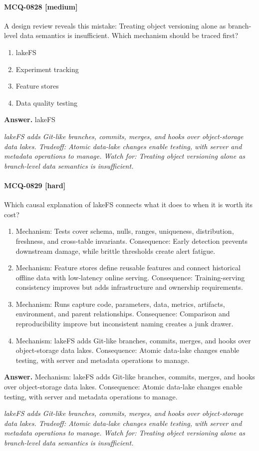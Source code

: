 \paragraph{MCQ-0828 [medium]} A design review reveals this mistake: Treating object versioning alone as branch-level data semantics is insufficient. Which mechanism should be traced first?
\begin{enumerate}[label=\Alph*.]
\item lakeFS
\item Experiment tracking
\item Feature stores
\item Data quality testing
\end{enumerate}
\noindent\textbf{Answer.} lakeFS
\par\textit{lakeFS adds Git-like branches, commits, merges, and hooks over object-storage data lakes. Tradeoff: Atomic data-lake changes enable testing, with server and metadata operations to manage. Watch for: Treating object versioning alone as branch-level data semantics is insufficient.}
\paragraph{MCQ-0829 [hard]} Which causal explanation of lakeFS connects what it does to when it is worth its cost?
\begin{enumerate}[label=\Alph*.]
\item Mechanism: Tests cover schema, nulls, ranges, uniqueness, distribution, freshness, and cross-table invariants. Consequence: Early detection prevents downstream damage, while brittle thresholds create alert fatigue.
\item Mechanism: Feature stores define reusable features and connect historical offline data with low-latency online serving. Consequence: Training-serving consistency improves but adds infrastructure and ownership requirements.
\item Mechanism: Runs capture code, parameters, data, metrics, artifacts, environment, and parent relationships. Consequence: Comparison and reproducibility improve but inconsistent naming creates a junk drawer.
\item Mechanism: lakeFS adds Git-like branches, commits, merges, and hooks over object-storage data lakes. Consequence: Atomic data-lake changes enable testing, with server and metadata operations to manage.
\end{enumerate}
\noindent\textbf{Answer.} Mechanism: lakeFS adds Git-like branches, commits, merges, and hooks over object-storage data lakes. Consequence: Atomic data-lake changes enable testing, with server and metadata operations to manage.
\par\textit{lakeFS adds Git-like branches, commits, merges, and hooks over object-storage data lakes. Tradeoff: Atomic data-lake changes enable testing, with server and metadata operations to manage. Watch for: Treating object versioning alone as branch-level data semantics is insufficient.}
